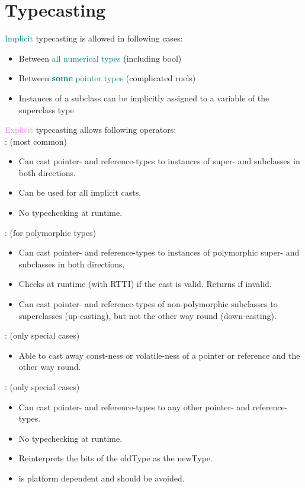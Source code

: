 \section{Typecasting}
    \textcolor{teal}{Implicit} typecasting is allowed in following cases:
    \begin{itemize}
        \item Between \textcolor{teal}{all numerical types} (including bool)
        \item Between \textcolor{teal}{\textbf{some} pointer types} (complicated ruels)
        \item Instances of a subclass can be implicitly assigned to a variable of the superclass type 
    \end{itemize}
    \textcolor{violet}{Explicit} typecasting allows following operators:\vspace{1mm}\\
    : (most common)
    \begin{itemize}
        \item Can cast pointer- and reference-types to instances of super- and subclasses in both directions.
        \item Can be used for all implicit casts.
        \item No typechecking at runtime.
    \end{itemize}
    : (for polymorphic types)
    \begin{itemize}
        \item Can cast pointer- and reference-types to instances of polymorphic super- and subclasses in both directions.
        \item Checks at runtime (with RTTI) if the cast is valid. Returns  if invalid.
        \item Can cast pointer- and reference-types of non-polymorphic subclasses to superclasses (up-casting), but not the other way round (down-casting).
    \end{itemize}
    : (only special cases)
    \begin{itemize}
        \item Able to cast away const-ness or volatile-ness of a pointer or reference and the other way round.
    \end{itemize}
    : (only special cases)
    \begin{itemize}
        \item Can cast pointer- and reference-types to any other pointer- and reference-types.
        \item No typechecking at runtime.
        \item Reinterprets the bits of the oldType as the newType.
        \item {} is platform dependent and should be avoided.
    \end{itemize}

